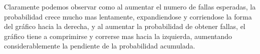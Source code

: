 \begin{itemize}
	Claramente podemos observar como al aumentar el numero de fallas esperadas, la probabilidad crece mucho mas lentamente, expandiendose y corriendose la forma del gr\'afico hacia la derecha, y al aumentar la probabilidad de obtener fallas, el gr\'afico tiene a comprimirse y correrse mas hacia la izquierda, aumentando considerablemente la pendiente de la probabilidad acumulada.
\end{itemize}
